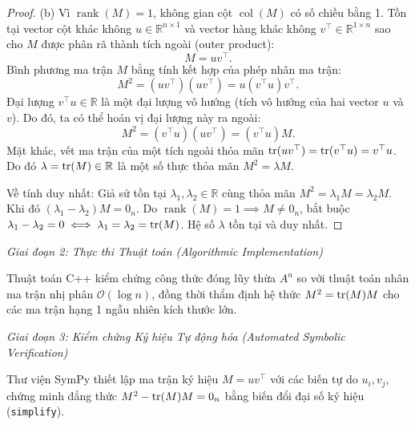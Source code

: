 \documentclass{article}
\begin{document}
\begin{proof}
	(b) Vì $\operatorname{rank}(M) = 1$, không gian cột $\operatorname{col}(M)$ có số chiều bằng 1. Tồn tại vector cột khác không $u \in \mathbb{R}^{n \times 1}$ và vector hàng khác không $v^\top \in \mathbb{R}^{1 \times n}$ sao cho $M$ được phân rã thành tích ngoài (outer product):
	\begin{equation*}
		M = u v^\top.
	\end{equation*}
	Bình phương ma trận $M$ bằng tính kết hợp của phép nhân ma trận:
	\begin{equation*}
		M^2 = (u v^\top)(u v^\top) = u (v^\top u) v^\top.
	\end{equation*}
	Đại lượng $v^\top u \in \mathbb{R}$ là một đại lượng vô hướng (tích vô hướng của hai vector $u$ và $v$). Do đó, ta có thể hoán vị đại lượng này ra ngoài:
	\begin{equation*}
		M^2 = (v^\top u) (u v^\top) = (v^\top u) M.
	\end{equation*}
	Mặt khác, vết ma trận của một tích ngoài thỏa mãn ${\rm tr}(u v^\top) = {\rm tr}(v^\top u) = v^\top u$. Do đó $\lambda = {\rm tr}(M) \in \mathbb{R}$ là một số thực thỏa mãn $M^2 = \lambda M$.
	
	Về tính duy nhất: Giả sử tồn tại $\lambda_1, \lambda_2 \in \mathbb{R}$ cùng thỏa mãn $M^2 = \lambda_1 M = \lambda_2 M$. Khi đó $(\lambda_1 - \lambda_2) M = 0_n$. Do $\operatorname{rank}(M) = 1 \implies M \ne 0_n$, bắt buộc $\lambda_1 - \lambda_2 = 0 \iff \lambda_1 = \lambda_2 = {\rm tr}(M)$. Hệ số $\lambda$ tồn tại và duy nhất.
\end{proof}

\vspace{0.5em}\noindent\emph{Giai đoạn 2: Thực thi Thuật toán (Algorithmic Implementation)}

Thuật toán C++ kiểm chứng công thức đóng lũy thừa $A^n$ so với thuật toán nhân ma trận nhị phân $\mathcal{O}(\log n)$, đồng thời thẩm định hệ thức $M^2 = {\rm tr}(M)M$ cho các ma trận hạng 1 ngẫu nhiên kích thước lớn.



\vspace{0.5em}\noindent\emph{Giai đoạn 3: Kiểm chứng Ký hiệu Tự động hóa (Automated Symbolic Verification)}

Thư viện \textsf{SymPy} thiết lập ma trận ký hiệu $M = u v^\top$ với các biến tự do $u_i, v_j$, chứng minh đẳng thức $M^2 - {\rm tr}(M)M = 0_n$ bằng biến đổi đại số ký hiệu (\texttt{simplify}).
\end{document}
